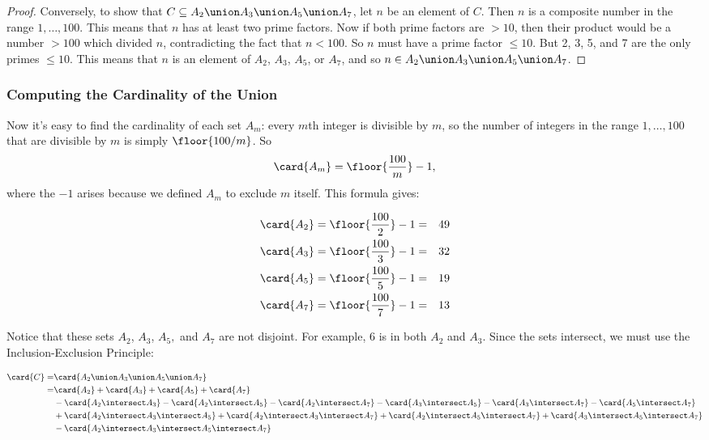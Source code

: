 \begin{editingnotes}
\begin{proof}
Conversely, to show that $C \subseteq A_2 \union A_3 \union A_5 \union A_7$, let
$n$ be an element of $C$.  Then $n$ is a composite number in the range $1,
\dots, 100$.  This means that $n$ has at least two prime factors.  Now if
both prime factors are $> 10$, then their product would be a number $>
100$ which divided $n$, contradicting the fact that $n<100$.  So $n$ must
have a prime factor $\leq 10$.  But 2, 3, 5, and 7 are the only primes
$\leq 10$.  This means that $n$ is an element of $A_2$, $A_3$, $A_5$, or
$A_7$, and so $n \in A_2 \union A_3 \union A_5 \union A_7$.
\end{proof}

\subsubsection{Computing the Cardinality of the Union}

Now it's easy to find the cardinality of each set $A_m$: every $m$th
integer is divisible by $m$, so the number of integers in the range $1,
\dots, 100$ that are divisible by $m$ is simply $\floor{100/m}$.  So
\[
\card{A_m} = \floor{\frac{100}{m}} - 1,
\]
where the $-1$ arises because we defined $A_m$ to exclude $m$ itself.
This formula gives:

\begin{eqnarray*}
\card{A_2} & = \floor{\frac{100}{2}} - 1 = & 49 \\
\card{A_3} & = \floor{\frac{100}{3}} - 1 = & 32 \\
\card{A_5} & = \floor{\frac{100}{5}} - 1 = & 19 \\
\card{A_7} & = \floor{\frac{100}{7}} - 1 = & 13
\end{eqnarray*}

Notice that these sets $A_2$, $A_3$, $A_5,$ and $A_7$ are not disjoint.
For example, 6 is in both $A_2$ and $A_3$.  Since the sets intersect, we
must use the Inclusion-Exclusion Principle:

\begin{align*}
\card{C}
  = & \card{A_2 \union A_3 \union A_5 \union A_7} \\
  = & \card{A_2} + \card{A_3} + \card{A_5} + \card{A_7} \\
    & - \card{A_2 \intersect A_3} - \card{A_2 \intersect A_5} - \card{A_2 \intersect A_7}
             - \card{A_3 \intersect A_5} - \card{A_3 \intersect A_7} - \card{A_5 \intersect A_7} \\
    & + \card{A_2 \intersect A_3 \intersect A_5} + \card{A_2 \intersect A_3 \intersect A_7}
             + \card{A_2 \intersect A_5 \intersect A_7} + \card{A_3 \intersect A_5 \intersect A_7} \\
    & - \card{A_2 \intersect A_3 \intersect A_5 \intersect A_7}
\end{align*}


\end{editingnotes}
